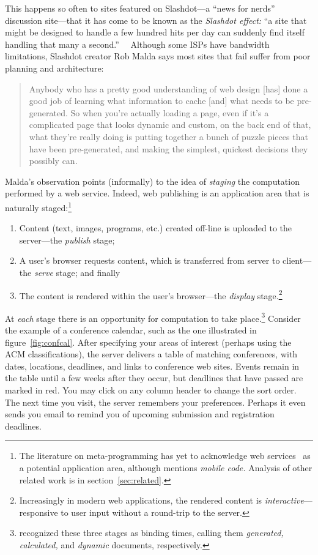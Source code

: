 \documentclass{elsart}
\begin{document}
This happens so often to sites featured on Slashdot---a
``news for nerds'' discussion site---that it has come to be
known as the \emph{Slashdot effect:} ``a site that might be
designed to handle a few hundred hits per day can suddenly
find itself handling that many a
second.''~\cite{turner03slashdot}~ Although some ISPs have
bandwidth limitations, Slashdot creator Rob Malda says most
sites that fail suffer from poor planning and architecture:
\begin{quote}
  Anybody who has a pretty good
  understanding of web design [has] done a good job of
  learning what information to cache [and] what needs
  to be pre-generated.  So when you're actually loading a
  page, even if it's a complicated page that looks dynamic
  and custom, on the back end of that, what they're really
  doing is putting together a bunch of puzzle pieces that
  have been pre-generated, and making the simplest, quickest
  decisions they possibly can.~\cite{turner03slashdot}
\end{quote}

Malda's observation points (informally) to the idea of \emph{staging}
the computation performed by a web service.  Indeed, web publishing is
an application area that is naturally staged:\footnote{The literature
on meta-programming has yet to acknowledge
  web services~\cite{w3c-wsdl} as a potential application area,
  although \citet{sheard01accomp} mentions \emph{mobile code.}
  Analysis of other related work is in section~\ref{sec:related}.} %
\begin{enumerate}
\item Content (text, images, programs, etc.) created
  off-line is uploaded to the server---the \emph{publish}
  stage;
  
\item A user's browser requests content, which is
  transferred from server to client---the \emph{serve}
  stage; and finally
  
\item The content is rendered within the user's browser---the
  \emph{display} stage.\footnote{Increasingly in modern web
    applications, the rendered content is
    \emph{interactive}---responsive to user input without a round-trip
    to the server.}
\end{enumerate}
At \emph{each} stage there is an opportunity for computation to take
place.\footnote{\citet{normark02programmatic} recognized these three
stages as binding times, calling them 
\emph{generated, calculated,} and \emph{dynamic} documents,
respectively.}
Consider the example of a conference calendar, such as the one
illustrated in figure~\ref{fig:confcal}.  After specifying your areas
of interest (perhaps using the ACM classifications), the server
delivers a table of matching conferences, with dates, locations,
deadlines, and links to conference web sites.  Events remain in the
table until a few weeks after they occur, but deadlines that have
passed are marked in red.  You may click on any column header to
change the sort order.  The next time you visit, the server remembers
your preferences.  Perhaps it even sends you email to remind you of
upcoming submission and registration deadlines.
\end{document}
